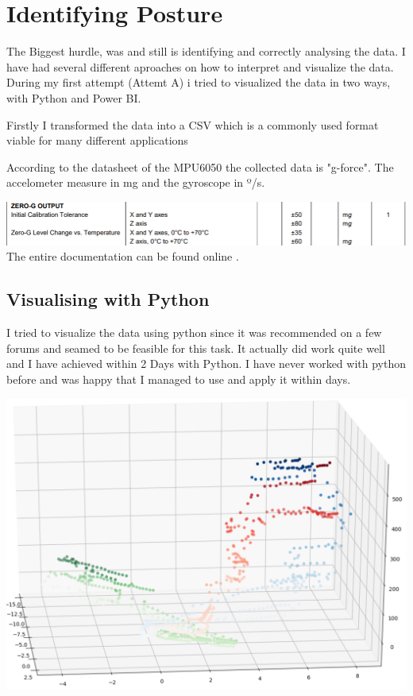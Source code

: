 \section{Identifying Posture}

The Biggest hurdle, was and still is identifying and correctly analysing the data. I have had several different aproaches on how to interpret and visualize the data. During my first attempt (Attemt A) i tried to visualized the data in two ways, with Python and Power BI.

Firstly I transformed the data into a CSV which is a commonly used format viable for many different applications

According to the datasheet of the MPU6050 the collected data is "g-force". The accelometer measure in mg and the gyroscope in º/s. 

\includegraphics[width=\linewidth]{images/MPU6050_DATA.png}
The entire documentation can be found online \cite{MPU6000D59:online}.

\subsection{Visualising with Python}

I tried to visualize the data using python since it was recommended on a few forums and seamed to be feasible for this task. It actually did work quite well and I have achieved within 2 Days with Python. I have never worked with python before and was happy that I managed to use and apply it within days. 

\includegraphics[width=\linewidth]{images/PyVisualisation.png}


